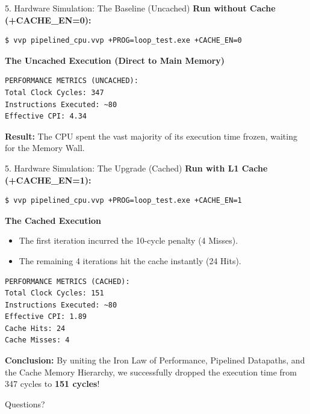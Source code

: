 \documentclass[aspectratio=169]{beamer}
\begin{document}
\begin{frame}[fragile]{5. Hardware Simulation: The Baseline (Uncached)}
\textbf{Run without Cache (+CACHE\_EN=0):}
\begin{verbatim}
$ vvp pipelined_cpu.vvp +PROG=loop_test.exe +CACHE_EN=0
\end{verbatim}

\textbf{The Uncached Execution (Direct to Main Memory)}
\begin{verbatim}
PERFORMANCE METRICS (UNCACHED):
Total Clock Cycles: 347
Instructions Executed: ~80
Effective CPI: 4.34
\end{verbatim}
\textbf{Result:} The CPU spent the vast majority of its execution time frozen, waiting for the Memory Wall.
\end{frame}

\begin{frame}[fragile]{5. Hardware Simulation: The Upgrade (Cached)}
\textbf{Run with L1 Cache (+CACHE\_EN=1):}
\begin{verbatim}
$ vvp pipelined_cpu.vvp +PROG=loop_test.exe +CACHE_EN=1
\end{verbatim}
\textbf{The Cached Execution}
\begin{itemize}
    \item The first iteration incurred the 10-cycle penalty (4 Misses).
    \item The remaining 4 iterations hit the cache instantly (24 Hits).
\end{itemize}
\vspace{0.2cm}
\begin{verbatim}
PERFORMANCE METRICS (CACHED):
Total Clock Cycles: 151
Instructions Executed: ~80
Effective CPI: 1.89
Cache Hits: 24
Cache Misses: 4
\end{verbatim}
\textbf{Conclusion:} By uniting the Iron Law of Performance, Pipelined Datapaths, and the Cache Memory Hierarchy, we successfully dropped the execution time from 347 cycles to \textbf{151 cycles}!
\end{frame}

\begin{frame}
\begin{center}
    \Huge Questions?
\end{center}
\end{frame}
\end{document}

